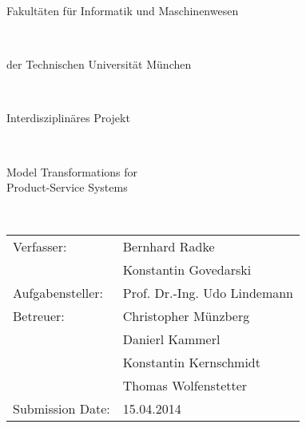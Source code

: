 \frontmatter
\pagestyle{empty}

\begin{titlepage}
\begin{center}
\begin{huge}
Fakult\"aten f\"ur Informatik und Maschinenwesen
\end{huge}\\
\vspace{4mm}
\begin{Large}
der Technischen Universit\"at M\"unchen
\end{Large}\\
\vspace{2.5cm}
\begin{Large}
Interdisziplin\"ares Projekt
\vspace{2.75cm}
\end{Large}\\
\begin{huge}
Model Transformations for\\\vspace{5mm} Product-Service Systems
\end{huge}\\
\vspace{1.25cm}
\begin{large}
\begin{tabular}{ll}
\vspace{0.1in}
Verfasser:& Bernhard Radke\\
\vspace{0.2in}
& Konstantin Govedarski\\
\vspace{0.2in}
Aufgabensteller:&Prof. Dr.-Ing. Udo Lindemann\\
\vspace{0.1in}
Betreuer: &Christopher M\"unzberg\\	
\vspace{0.1in}
&Danierl Kammerl\\
\vspace{0.1in}
&Konstantin Kernschmidt\\
\vspace{0.2in}
&Thomas Wolfenstetter\\
Submission Date:&15.04.2014\end{tabular}
\end{large}
\end{center}


\end{titlepage}
